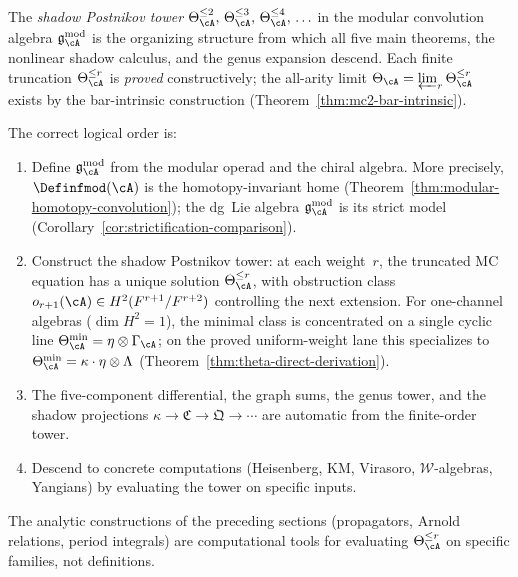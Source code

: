 \begin{remark}
\label{rem:unifying-principle}
The \emph{shadow Postnikov tower}
$\Theta_\cA^{\leq 2},\, \Theta_\cA^{\leq 3},\,
\Theta_\cA^{\leq 4},\, \ldots$
in the modular convolution algebra
$\mathfrak{g}_{\cA}^{\mathrm{mod}}$ is the
organizing structure from which all five main theorems, the
nonlinear shadow calculus, and the genus expansion descend.
Each finite truncation $\Theta_\cA^{\leq r}$ is \emph{proved}
constructively; the all-arity limit
$\Theta_\cA = \varprojlim_r \Theta_\cA^{\leq r}$ exists by the
bar-intrinsic construction
\textup{(}Theorem~\textup{\ref{thm:mc2-bar-intrinsic})}.

The correct logical order is:
\begin{enumerate}[label=\textup{(\arabic*)}]
\item Define $\mathfrak{g}_{\cA}^{\mathrm{mod}}$ from the modular
  operad and the chiral algebra.
  More precisely, $\Definfmod(\cA)$ is the homotopy-invariant
  home \textup{(}Theorem~\textup{\ref{thm:modular-homotopy-convolution})};
  the dg~Lie algebra $\mathfrak{g}_{\cA}^{\mathrm{mod}}$ is its
  strict model
  \textup{(}Corollary~\textup{\ref{cor:strictification-comparison})}.
\item Construct the shadow Postnikov tower: at each weight~$r$,
  the truncated MC equation has a unique solution
  $\Theta_\cA^{\leq r}$, with obstruction class
  $o_{r+1}(\cA) \in H^2(F^{r+1}/F^{r+2})$ controlling the next
  extension.  For one-channel algebras
  \textup{(}$\dim H^2 = 1$\textup{)}, the minimal class is
  concentrated on a single cyclic line
  $\Theta^{\min}_\cA = \eta\otimes\Gamma_\cA$; on the proved
  uniform-weight lane this specializes to
  $\Theta^{\min}_\cA = \kappa \cdot \eta \otimes \Lambda$
  \textup{(}Theorem~\textup{\ref{thm:theta-direct-derivation})}.
\item The five-component differential, the graph sums, the genus
  tower, and the shadow projections
  $\kappa \to \mathfrak{C} \to \mathfrak{Q} \to \cdots$
  are automatic from the finite-order tower.
\item Descend to concrete computations \textup{(}Heisenberg, KM,
  Virasoro, $\mathcal{W}$-algebras, Yangians\textup{)} by
  evaluating the tower on specific inputs.
\end{enumerate}
The analytic constructions of the preceding sections
\textup{(}propagators, Arnold relations, period integrals\textup{)}
are computational tools for evaluating $\Theta_{\cA}^{\leq r}$
on specific families, not definitions.
\end{remark}

